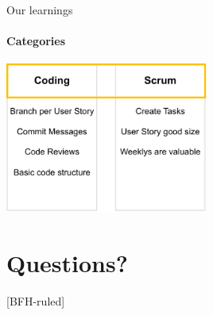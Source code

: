 \documentclass[
    ngerman,%
    authorontitle=true,
]{bfhbeamer}
\begin{document}
    \begin{frame}{Our learnings}
        \framesubtitle{Categories}
        \begin{center}
            \includegraphics[width=0.5\textwidth]{pictures/scrum_adaptions-learnings}
        \end{center}
    \end{frame}




    \section{Questions?}
    [BFH-ruled]
    \frame{\sectionpage}








\end{document}
